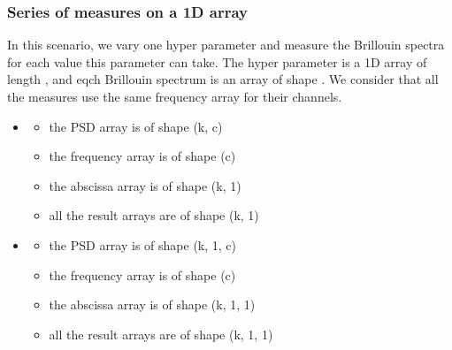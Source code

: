 \documentclass[letterpaper,10pt,english]{sphinxmanual}
\begin{document}
\subsubsection{Series of measures on a 1D array}
\label{\detokenize{source/normalization:series-of-measures-on-a-1d-array}}
\sphinxAtStartPar
In this scenario, we vary one hyper parameter and measure the Brillouin spectra for each value this parameter can take. The hyper parameter is a 1D array of length , and eqch Brillouin spectrum is an array of shape . We consider that all the measures use the same frequency array for their channels.
\begin{itemize}
\item {} \begin{description}
\begin{itemize}
\item {} 
\sphinxAtStartPar
the PSD array is of shape (k, c)

\item {} 
\sphinxAtStartPar
the frequency array is of shape (c)

\item {} 
\sphinxAtStartPar
the abscissa array is of shape (k, 1)

\item {} 
\sphinxAtStartPar
all the result arrays are of shape (k, 1)

\end{itemize}

\end{description}

\item {} \begin{description}
\begin{itemize}
\item {} 
\sphinxAtStartPar
the PSD array is of shape (k, 1, c)

\item {} 
\sphinxAtStartPar
the frequency array is of shape (c)

\item {} 
\sphinxAtStartPar
the abscissa array is of shape (k, 1, 1)

\item {} 
\sphinxAtStartPar
all the result arrays are of shape (k, 1, 1)


\end{itemize}
\end{description}
\end{itemize}
\end{document}
